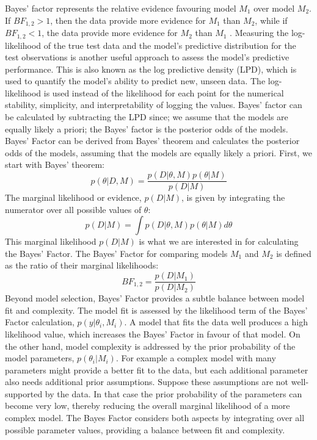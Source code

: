 Bayes' factor represents the relative evidence favouring model $M_1$ over
model $M_2$. If $BF_{1,2}>1$, then the data provide more evidence for $M_1$
than $M_2$, while if $BF_{1,2}<1$, the data provide more evidence for $M_2$
than $M_1$ \cite{statrethinking}. 
Measuring the log-likelihood of the true test data and the model's predictive
distribution for the test observations is another useful approach to assess the
model's predictive performance. This is also known as the log predictive
density (LPD), which is used to quantify the model's ability to predict new,
unseen data. The log-likelihood is used instead of the likelihood for each
point for the numerical stability, simplicity, and interpretability of logging
the values.
Bayes' factor can be calculated by subtracting the LPD since; we assume that
the models are equally likely a priori; the Bayes' factor is the posterior odds
of the models. 
Bayes' Factor can be derived from Bayes' theorem and calculates the posterior
odds of the models, assuming that the models are equally likely a priori.
First, we start with Bayes' theorem:
\begin{equation}
p(\theta|D,M) = \frac{p(D|\theta,M)p(\theta|M)}{p(D|M)}
\end{equation}
The marginal likelihood or evidence, $p(D|M)$, is given by integrating the numerator over all possible values of $\theta$:
\begin{equation}
p(D|M) = \int p(D|\theta,M)p(\theta|M) d\theta
\end{equation}
This marginal likelihood $p(D|M)$ is what we are interested in for calculating the Bayes' Factor.
The Bayes' Factor for comparing models $M_1$ and $M_2$ is defined as the ratio of their marginal likelihoods:
\begin{equation}
BF_{1,2} = \frac{p(D|M_1)}{p(D|M_2)}
\end{equation}
Beyond model selection, Bayes' Factor provides a subtle balance
between model fit and complexity. The model fit is assessed by the
likelihood term of the Bayes' Factor calculation, $p(y|\theta_{i},M_{i})$. A
model that fits the data well produces a high likelihood value, which increases
the Bayes' Factor in favour of that model. On the other hand, model complexity
is addressed by the prior probability of the model parameters,
$p(\theta_{i}|M_{i})$. For example a complex model with many parameters might provide a
better fit to the data, but each additional parameter also needs additional
prior assumptions. Suppose these assumptions are not well-supported by the data. In that case the
prior probability of the parameters can become very low, thereby reducing the
overall marginal likelihood of a more complex model. The Bayes Factor considers
both aspects by integrating over all possible parameter values, providing a balance
between fit and complexity.
